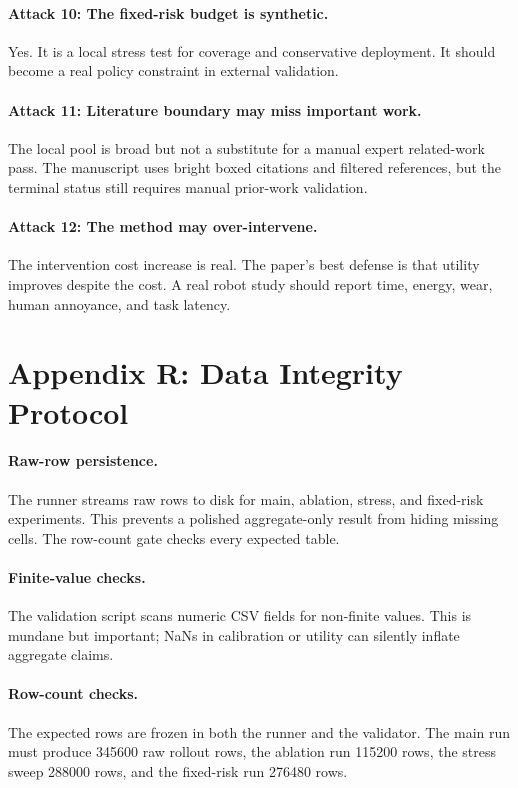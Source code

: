 \documentclass{article}
\begin{document}
\paragraph{Attack 10: The fixed-risk budget is synthetic.}
Yes. It is a local stress test for coverage and conservative deployment. It should become a real policy constraint in external validation.

\paragraph{Attack 11: Literature boundary may miss important work.}
The local pool is broad but not a substitute for a manual expert related-work pass. The manuscript uses bright boxed citations and filtered references, but the terminal status still requires manual prior-work validation.

\paragraph{Attack 12: The method may over-intervene.}
The intervention cost increase is real. The paper's best defense is that utility improves despite the cost. A real robot study should report time, energy, wear, human annoyance, and task latency.

\section{Appendix R: Data Integrity Protocol}
\paragraph{Raw-row persistence.}
The runner streams raw rows to disk for main, ablation, stress, and fixed-risk experiments. This prevents a polished aggregate-only result from hiding missing cells. The row-count gate checks every expected table.

\paragraph{Finite-value checks.}
The validation script scans numeric CSV fields for non-finite values. This is mundane but important; NaNs in calibration or utility can silently inflate aggregate claims.

\paragraph{Row-count checks.}
The expected rows are frozen in both the runner and the validator. The main run must produce 345600 raw rollout rows, the ablation run 115200 rows, the stress sweep 288000 rows, and the fixed-risk run 276480 rows.
\end{document}
